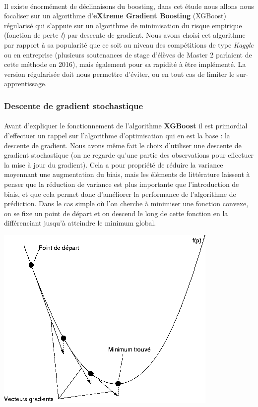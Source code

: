 \documentclass[14pt, openany]{article}
\begin{document}
\paragraph{}
Il existe énormément de déclinaisons du boosting, dans cet étude nous allons nous focaliser sur un algorithme d'\textbf{eXtreme Gradient Boosting} (XGBoost) régularisé qui s'appuie sur un algorithme de minimisation du risque empirique (fonction de perte \textit{l}) par descente de gradient. Nous avons choisi cet algorithme par rapport à sa popularité que ce soit au niveau des compétitions de type \textit{Kaggle} ou en entreprise (plusieurs soutenances de stage d'élèves de Master 2 parlaient de cette méthode en 2016), mais également pour sa rapidité à être implémenté. La version régularisée doit nous permettre d'éviter, ou en tout cas de limiter le sur-apprentissage.
\newpage
\subsubsection{Descente de gradient stochastique}
\paragraph{}
Avant d'expliquer le fonctionnement de l'algorithme \textbf{XGBoost} il est primordial d'effectuer un rappel sur l'algorithme d'optimisation qui en est la base : la descente de gradient. Nous avons même fait le choix d'utiliser une descente de gradient stochastique (on ne regarde qu'une partie des observations pour effectuer la mise à jour du gradient). Cela a pour propriété de réduire la variance moyennant une augmentation du biais, mais les éléments de littérature laissent à penser que la réduction de variance est plus importante que l'introduction de biais, et que cela permet donc d'améliorer la performance de l'algorithme de prédiction. Dans le cas simple où l'on cherche à minimiser une fonction convexe, on se fixe un point de départ et on \og descend \fg{} le long de cette fonction en la différenciant jusqu'à atteindre le minimum global.
\begin{center}
\includegraphics[scale=0.7]{Images/descente.png}
\end{center}
\begin{center}
\end{center}
\end{document}
